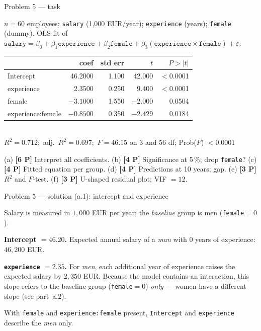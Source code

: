 \documentclass[aspectratio=169,11pt]{beamer}
\begin{document}
\begin{frame}{Problem 5 --- task}
  \begin{exercise}
    $n=60$ employees; \texttt{salary} (1{,}000 EUR/year); \texttt{experience} (years);
    \texttt{female} (dummy). OLS fit of
    $\texttt{salary}=\beta_0+\beta_1\texttt{experience}+\beta_2\texttt{female}
      +\beta_3(\texttt{experience}\!\times\!\texttt{female})+\varepsilon$:
    \begin{center}\scriptsize
    \begin{tabular}{lrrrr}
      \toprule
      & coef & std err & $t$ & $P>|t|$\\
      \midrule
      Intercept & 46.2000 & 1.100 & 42.000 & $<$0.0001\\
      experience & 2.3500 & 0.250 & 9.400 & $<$0.0001\\
      female & $-3.1000$ & 1.550 & $-2.000$ & 0.0504\\
      experience:female & $-0.8500$ & 0.350 & $-2.429$ & 0.0184\\
      \bottomrule
    \end{tabular}\\[1mm]
    $R^2=0.712$;\ adj.\ $R^2=0.697$;\ $F=46.15$ on 3 and 56 df; Prob($F$) $<0.0001$
    \end{center}
    (a) \textbf{[6 P]} Interpret all coefficients. (b) \textbf{[4 P]} Significance at 5\,\%; drop \texttt{female}?
    (c) \textbf{[4 P]} Fitted equation per group. (d) \textbf{[4 P]} Predictions at 10 years; gap.
    (e) \textbf{[3 P]} $R^2$ and $F$-test. (f) \textbf{[3 P]} U-shaped residual plot; VIF $=12$.
  \end{exercise}
\end{frame}

\begin{frame}{Problem 5 --- solution (a.1): intercept and experience}
  \begin{solutionbox}
    Salary is measured in $1{,}000$ EUR per year; the \emph{baseline} group is men
    (\texttt{female}$=0$).
    \medskip

    \textbf{Intercept $=46.20$.} Expected annual salary of a \emph{man} with $0$ years of
    experience: $46{,}200$ EUR.
    \medskip

    \textbf{\texttt{experience} $=2.35$.} For \emph{men}, each additional year of experience
    raises the expected salary by $2{,}350$ EUR. Because the model contains an interaction, this
    slope refers to the baseline group (\texttt{female}$=0$) \emph{only} --- women have a
    different slope (see part~a.2).
  \end{solutionbox}
  \begin{takeaway}
    With \texttt{female} and \texttt{experience:female} present, \texttt{Intercept} and
    \texttt{experience} describe the \emph{men} only.
  \end{takeaway}
\end{frame}
\end{document}
